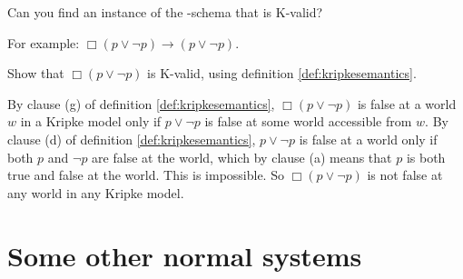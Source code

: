 \begin{exercise}
  Can you find an instance of the -schema that is K-valid?
\end{exercise}
\begin{solution}
  For example: $\Box(p \lor \neg p) \to (p \lor \neg p)$.
\end{solution}

\begin{exercise}
  Show that $\Box(p \lor \neg p)$ is K-valid, using definition
  \ref{def:kripkesemantics}.
\end{exercise}
\begin{solution}
  By clause (g) of definition \ref{def:kripkesemantics}, $\Box(p \lor \neg p)$
  is false at a world $w$ in a Kripke model only if $p \lor \neg p$ is false at
  some world accessible from $w$. By clause (d) of definition
  \ref{def:kripkesemantics}, $p \lor \neg p$ is false at a world only if both
  $p$ and $\neg p$ are false at the world, which by clause (a) means that $p$ is
  both true and false at the world. This is impossible. So $\Box(p \lor \neg p)$
  is not false at any world in any Kripke model.
\end{solution}

  


\section{Some other normal systems}\label{sec:normalsystems}

